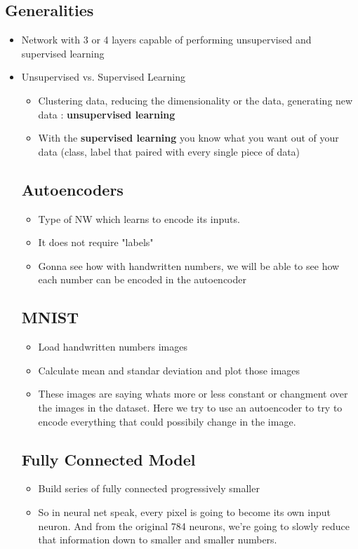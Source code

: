 \documentclass[12pt,a4paper]{article}
\begin{document}
\subsection{Generalities}
\begin{itemize}
\item Network with 3 or 4 layers capable of performing unsupervised and supervised learning
\item Unsupervised vs. Supervised Learning
\begin{itemize}
\item Clustering data, reducing the dimensionality or the data, generating new data : \textbf{unsupervised learning}
\item With the \textbf{supervised learning} you know what you want out of your data (class, label that paired with every single piece of data)
\end{itemize}
\subsection{Autoencoders}
\begin{itemize}
\item Type of NW which learns to encode its inputs.
\item It does not require "labels"
\item Gonna see how with handwritten numbers, we will be able to see how each number can be encoded in the autoencoder
\end{itemize}
\subsection{MNIST}
\begin{itemize}
\item Load handwritten numbers images
\item Calculate mean and standar deviation and plot those images
\item These images are saying whats more or less constant or changment over the images in the dataset. Here we try to use an autoencoder to try to encode everything that could possibily change in the image.
\end{itemize}
\subsection{Fully Connected Model}
\begin{itemize}
\item Build series of fully connected progressively smaller
\item So in neural net speak, every pixel is going to become its own input neuron. And from the original 784 neurons, we're going to slowly reduce that information down to smaller and smaller numbers.
\end{itemize}

\end{itemize}
\end{document}
